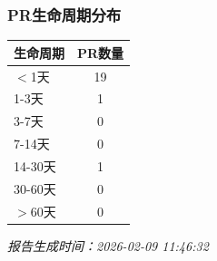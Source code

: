 \subsubsection*{PR生命周期分布}
\begin{longtable}{l|c}
\hline
\textbf{生命周期} & \textbf{PR数量} \\
\hline
$<$1天 & 19 \\
1-3天 & 1 \\
3-7天 & 0 \\
7-14天 & 0 \\
14-30天 & 1 \\
30-60天 & 0 \\
$>$60天 & 0 \\
\hline
\end{longtable}

\vspace{1em}
\textit{报告生成时间：2026-02-09 11:46:32}
